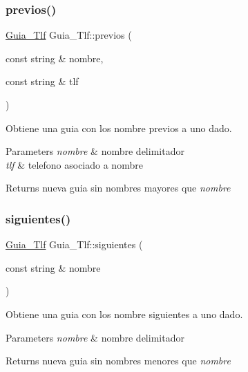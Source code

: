 \subsubsection{\texorpdfstring{previos()}{previos()}}
{\footnotesize\ttfamily \mbox{\hyperlink{classGuia__Tlf}{Guia\+\_\+\+Tlf}} Guia\+\_\+\+Tlf\+::previos (\begin{DoxyParamCaption}\item[{const string \&}]{nombre,  }\item[{const string \&}]{tlf }\end{DoxyParamCaption})}



Obtiene una guia con los nombre previos a uno dado. 


\begin{DoxyParams}{Parameters}
{\em nombre} & nombre delimitador \\
\hline
{\em tlf} & telefono asociado a nombre \\
\hline
\end{DoxyParams}
\begin{DoxyReturn}{Returns}
nueva guia sin nombres mayores que {\itshape nombre} 
\end{DoxyReturn}
\mbox{\label{classGuia__Tlf_a20ab0ba1722b23d3b13746e75ee23b53}} 
\subsubsection{\texorpdfstring{siguientes()}{siguientes()}}
{\footnotesize\ttfamily \mbox{\hyperlink{classGuia__Tlf}{Guia\+\_\+\+Tlf}} Guia\+\_\+\+Tlf\+::siguientes (\begin{DoxyParamCaption}\item[{const string \&}]{nombre }\end{DoxyParamCaption})}



Obtiene una guia con los nombre siguientes a uno dado. 


\begin{DoxyParams}{Parameters}
{\em nombre} & nombre delimitador \\
\hline
\end{DoxyParams}
\begin{DoxyReturn}{Returns}
nueva guia sin nombres menores que {\itshape nombre} 
\end{DoxyReturn}
\mbox{\label{classGuia__Tlf_a727ab46d490b4196a71f623644906a81}} 
